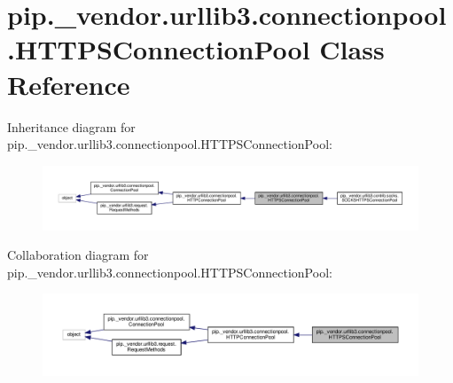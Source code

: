 \hypertarget{classpip_1_1__vendor_1_1urllib3_1_1connectionpool_1_1HTTPSConnectionPool}{}\section{pip.\+\_\+vendor.\+urllib3.\+connectionpool.\+H\+T\+T\+P\+S\+Connection\+Pool Class Reference}
\label{classpip_1_1__vendor_1_1urllib3_1_1connectionpool_1_1HTTPSConnectionPool}


Inheritance diagram for pip.\+\_\+vendor.\+urllib3.\+connectionpool.\+H\+T\+T\+P\+S\+Connection\+Pool\+:
\nopagebreak
\begin{figure}[H]
\begin{center}
\leavevmode
\includegraphics[width=350pt]{classpip_1_1__vendor_1_1urllib3_1_1connectionpool_1_1HTTPSConnectionPool__inherit__graph}
\end{center}
\end{figure}


Collaboration diagram for pip.\+\_\+vendor.\+urllib3.\+connectionpool.\+H\+T\+T\+P\+S\+Connection\+Pool\+:
\nopagebreak
\begin{figure}[H]
\begin{center}
\leavevmode
\includegraphics[width=350pt]{classpip_1_1__vendor_1_1urllib3_1_1connectionpool_1_1HTTPSConnectionPool__coll__graph}
\end{center}
\end{figure}
